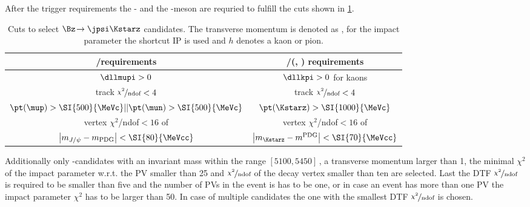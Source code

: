 After the trigger requirements the \Kstarz- and the \jpsi-meson are requried to fulfill the cuts shown in \cref{tab:selJpsiKst}.
\begin{table}[tbp]
	\centering
	\caption{Cuts to select $\Bz\!\to\jpsi\Kstarz$ candidates.
	The transverse momentum is denoted as \pt, for the impact parameter the shortcut IP is used and $h$ denotes a kaon or pion.}
	\begin{tabular}{cc}
		\toprule
		\jpsi/\muon requirements & \Kstarz/(\kaon, \pion) requirements\\
		\midrule
		$\dllmupi>0$											& $\dllkpi>0$ \hspace{0,2cm} for kaons \\
		track $\nicefrac{\chi^2}{\text{ndof}}<4$ 				& track $\nicefrac{\chi^2}{\text{ndof}}<4$ \\
		$\pt(\mup)>\SI{500}{\MeVc}||\pt(\mun)>\SI{500}{\MeVc}$  & $\pt(\Kstarz)>\SI{1000}{\MeVc}$\\
		vertex $\chi^2$/ndof$<16$ of \jpsi 						& vertex $\chi^2$/ndof$<16$ of \Kstarz\\
		$\left|m_{J/\psi}-m_\text{PDG}\right|<\SI{80}{\MeVcc}$ 	& $\left|m_{\Kstarz}-m^\text{PDG}\right|<\SI{70}{\MeVcc}$\\
		\bottomrule
	\end{tabular}
	\label{tab:selJpsiKst}
\end{table}
Additionally only \Bz-candidates with an invariant mass within the range $[5100, 5450]\,$\si[per-mode=symbol]{\MeVcc}, a transverse momentum larger than \SI{1}{\GeVc}, the minimal $\chi^2$ of the impact parameter w.r.t. the \ac{PV} smaller than \num{25} and $\nicefrac{\chi^2}{\text{ndof}}$ of the decay vertex smaller than ten are selected.
Last the DTF $\nicefrac{\chi^2}{\text{ndof}}$ is required to be smaller than five and the number of \ac{PV}s in the event is has to be one, or in case an event has more than one \ac{PV} the impact parameter $\chi^2$ has to be larger than \num{50}.
In case of multiple \Bz candidates the one with the smallest DTF $\nicefrac{\chi^2}{\text{ndof}}$ is chosen.

